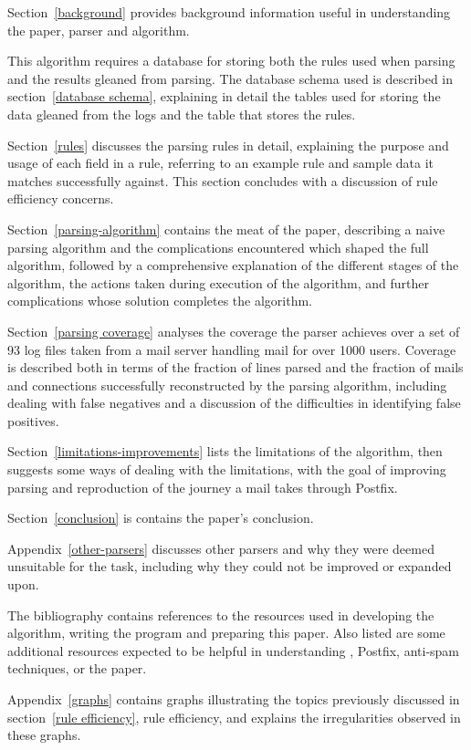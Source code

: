 \documentclass[a4paper,12pt,draft]{article}
\begin{document}
Section~\ref{background} provides background information useful in
understanding the paper, parser and algorithm.

This algorithm requires a database for storing both the rules used when
parsing and the results gleaned from parsing.  The database schema used is
described in section~\ref{database schema}, explaining in detail the tables
used for storing the data gleaned from the logs and the table that stores
the rules.

Section~\ref{rules} discusses the parsing rules in detail, explaining the
purpose and usage of each field in a rule, referring to an example rule and
sample data it matches successfully against.  This section concludes with a
discussion of rule efficiency concerns.

Section~\ref{parsing-algorithm} contains the meat of the paper, describing
a naive parsing algorithm and the complications encountered which shaped
the full algorithm, followed by a comprehensive explanation of the
different stages of the algorithm, the actions taken during execution of
the algorithm, and further complications whose solution completes the
algorithm.

Section~\ref{parsing coverage} analyses the coverage the parser achieves
over a set of 93 log files taken from a mail server handling mail for over
1000 users.  Coverage is described both in terms of the fraction of lines
parsed and the fraction of mails and connections successfully reconstructed
by the parsing algorithm, including dealing with false negatives and a
discussion of the difficulties in identifying false positives.

Section~\ref{limitations-improvements} lists the limitations of the
algorithm, then suggests some ways of dealing with the limitations, with
the goal of improving parsing and reproduction of the journey a mail takes
through Postfix.

Section~\ref{conclusion} is contains the paper's conclusion.

Appendix~\ref{other-parsers} discusses other parsers and why they were
deemed unsuitable for the task, including why they could not be improved or
expanded upon.

The bibliography contains references to the resources used in developing
the algorithm, writing the program and preparing this paper.  Also listed
are some additional resources expected to be helpful in understanding
\SMTP{}, Postfix, anti-spam techniques, or the paper.

Appendix~\ref{graphs} contains graphs illustrating the topics previously
discussed in section~\ref{rule efficiency}, rule efficiency, and explains
the irregularities observed in these graphs.
\end{document}
